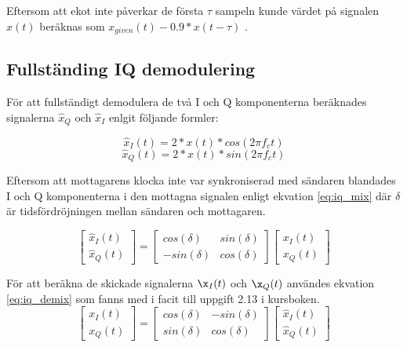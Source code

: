 \documentclass[10pt,twocolumn]{article}
\newcommand{\echodelay}{\tau}
\begin{document}
Eftersom att ekot inte påverkar de första $\echodelay$ sampeln kunde värdet på signalen $x(t)$ beräknas
som $x_{given}(t) - 0.9*x(t-\echodelay)$
.

\subsection{Fullständing IQ demodulering}

För att fullständigt demodulera de två I och Q komponenterna beräknades signalerna 
$\hat{x}_Q$ och $\hat{x}_I$ enlgit följande formler:

\[
    \hat{x}_I(t) = 2 * x(t) * cos(2\pi f_c t)
\]
\[
    \hat{x}_Q(t) = 2 * x(t) * sin(2\pi f_c t)
\]

Eftersom att mottagarens klocka inte var synkroniserad med sändaren blandades I och Q komponenterna
i den mottagna signalen enligt ekvation \ref{eq:iq_mix} där $\delta$ är tidsfördröjningen mellan sändaren och mottagaren.

\begin{equation}
    \label{eq:iq_mix}
    \left[
        \begin{array}{c}
            \hat{x}_I(t) \\
            \hat{x}_Q(t)
        \end{array}
    \right]
    =
    \left[
        \begin{array}{cc}
            cos(\delta) & sin(\delta) \\
            -sin(\delta) & cos(\delta)
        \end{array}
    \right]
    \left[
        \begin{array}{c}
            x_I(t) \\
            x_Q(t)
        \end{array}
    \right]
\end{equation}

För att beräkna de skickade signalerna $\x_I(t)$ och $\x_Q(t)$ användes ekvation \ref{eq:iq_demix} som
fanns med i facit till uppgift 2.13 i kursboken.
\begin{equation}
    \label{eq:iq_demix}
    \left[
        \begin{array}{c}
            x_I(t) \\
            x_Q(t)
        \end{array}
    \right]
    =
    \left[
        \begin{array}{cc}
            cos(\delta) & -sin(\delta) \\
            sin(\delta) & cos(\delta)
        \end{array}
    \right]
    \left[
        \begin{array}{c}
            \hat{x}_I(t) \\
            \hat{x}_Q(t)
        \end{array}
    \right]
\end{equation}
\end{document}

